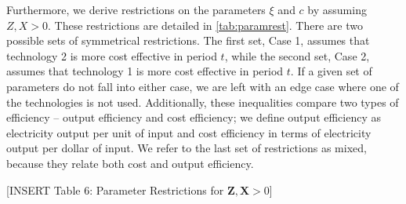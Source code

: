 \documentclass[11pt,a4paper,leqno]{extarticle}
\begin{document}
	Furthermore, we derive restrictions on the parameters $\xi$ and $c$ by assuming $Z, X > 0$. These restrictions are detailed in \autoref{tab:paramrest}. There are two possible sets of symmetrical restrictions. The first set, Case 1, assumes that technology 2 is more cost effective in period $t$, while the second set, Case 2, assumes that technology 1 is more cost effective in period $t$. If a given set of parameters do not fall into either case, we are left with an edge case where one of the technologies is not used. Additionally, these inequalities compare two types of efficiency -- output efficiency and cost efficiency; we define output efficiency as electricity output per unit of input and cost efficiency in terms of electricity output per dollar of input. We refer to the last set of restrictions as mixed, because they relate both cost and output efficiency. 


	\vspace{0.15in}
	\begin{center}
		[INSERT Table 6: Parameter Restrictions for $\mathbf{Z}, \mathbf{X} > 0$]
	\end{center}
	\vspace{0.15in}
	
\end{document}
